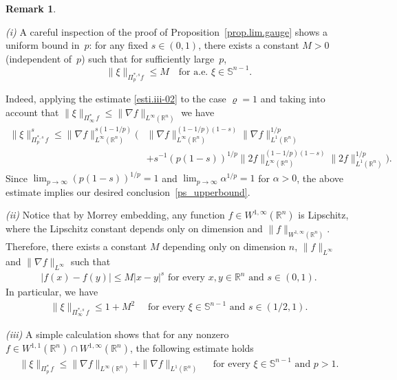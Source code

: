 \documentclass[11pt, reqno]{article}
\theoremstyle{definition}
\numberwithin{equation}{section}
\newtheorem{remark}[theorem]{Remark}
\newcommand{\R}{\mathbb{R}}
\newcommand{\Sphere}{\mathbb{S}^{n - 1}}
\begin{document}
\begin{remark}\label{rem.bounded-gauge}\normalfont
$ \, $

\smallskip


\textit{(i)}
A careful inspection of the proof of Proposition~\ref{prop.lim.gauge} shows a uniform bound in~$p$:
for any fixed ${s \in (0,1)}$, there exists a constant $M > 0$ (independent of~$p$) such that for sufficiently large~$p$,
\begin{equation}\label{ps_upperbound}
    \| \xi \|_{\Pi^{\ast, s}_p f} \le M 
    \quad \text{for a.e. } \xi \in \mathbb{S}^{n-1}.
\end{equation}

Indeed, applying the estimate \eqref{esti.iii-02} to the case $\varrho = 1$ and taking into account that $\| \xi \|_{\Pi^\ast_\infty \, f} \leq \| \nabla f \|_{L^\infty(\R^n)}$ we have 
\begin{align*}
	\| \xi \|^{s}_{\Pi^{\ast, s}_p \, f} \leq \| \nabla f \|^{s(1- 1/p)}_{L^\infty(\R^n)} 
	\Big( &
	\| \nabla f  \|_{L^\infty(\R^n)}^{(1 - 1/p)(1 - s)} \| \nabla f \|_{L^1(\R^n)}^{1/p}
    \\
    &
	+ 	s^{-1} (p(1 - s))^{1/p} \| 2f \|_{L^\infty(\R^n)}^{(1 - 1/p)(1 - s)} \| 2f \|_{L^1(\R^n)}^{1/p}
	\Big).
\end{align*}
Since $\textstyle\lim_{p \to \infty} (p(1 - s))^{1/p} = 1$ and $\textstyle\lim_{p \to \infty} \alpha^{1/p} = 1$ for $\alpha > 0$, the above estimate implies our desired conclusion~\eqref{ps_upperbound}.

\medskip

\textit{(ii)} Notice that by Morrey embedding, any function $f \in W^{1, \infty}(\R^n)$ is Lipschitz, where the Lipschitz constant depends only on dimension and $\| f \|_{W^{1, \infty}(\R^n)}$.
Therefore, there exists a constant $M$ depending only on dimension $n$, $\| f \|_{L^\infty}$ and $\| \nabla  f \|_{L^\infty}$ such that
\begin{align*}
    |f(x) - f(y)| \leq M |x - y|^s \text{ for every }x, y \in \R^n \text{ and } s \in (0, 1).
\end{align*}
In particular, we have
\begin{align*}
    \| \xi \|_{\Pi^{\ast, s}_\infty \, f} \leq 1 + M^2 \quad \text{ for every } \xi \in \Sphere \text{ and } s \in (1/2, 1).
\end{align*}

\medskip

\textit{(iii)} A simple calculation shows that for any nonzero $f \in W^{1, 1}(\R^n) \cap W^{1, \infty}(\R^n)$, the following estimate holds
\begin{align*}
    \| \xi \|_{\Pi^{\ast}_p \, f} \leq \| \nabla f \|_{L^\infty(\R^n)} + \| \nabla f \|_{L^1(\R^n)} \quad \text{ for every } \xi \in \Sphere \text{ and } p > 1.
\end{align*}
\end{remark}
\end{document}
